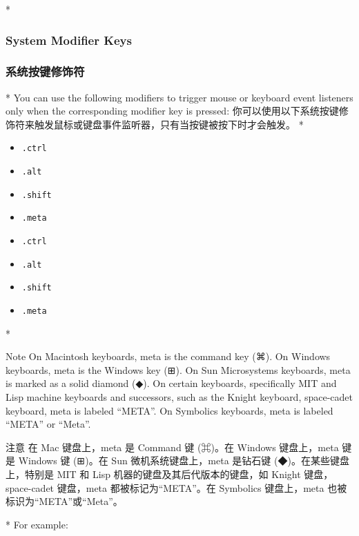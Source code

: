 \begin{paracol}{2}

\switchcolumn[0]*%
\subsubsection{System Modifier Keys}
\switchcolumn
\subsubsection{系统按键修饰符}
\switchcolumn[0]*%
You can use the following modifiers to trigger mouse or keyboard event
listeners only when the corresponding modifier key is pressed:
\switchcolumn
你可以使用以下系统按键修饰符来触发鼠标或键盘事件监听器，只有当按键被按下时才会触发。
\switchcolumn[0]*%
\begin{itemize}
\item
    \texttt{.ctrl}
\item
    \texttt{.alt}
\item
    \texttt{.shift}
\item
    \texttt{.meta}
\end{itemize}
\switchcolumn
\begin{itemize}
\item
    \texttt{.ctrl}
\item
    \texttt{.alt}
\item
    \texttt{.shift}
\item
    \texttt{.meta}
\end{itemize}
\switchcolumn[0]*%
\begin{vueQuote}{Note}
On Macintosh keyboards, meta is the command key (⌘). On Windows
keyboards, meta is the Windows key (⊞). On Sun Microsystems keyboards,
meta is marked as a solid diamond (◆). On certain keyboards,
specifically MIT and Lisp machine keyboards and successors, such as the
Knight keyboard, space-cadet keyboard, meta is labeled ``META''. On
Symbolics keyboards, meta is labeled ``META'' or ``Meta''.
\end{vueQuote}
\switchcolumn
\begin{vueQuote}{注意}
在 Mac 键盘上，meta 是 Command 键 (⌘)。在 Windows 键盘上，meta 键是
Windows 键 (⊞)。在 Sun 微机系统键盘上，meta 是钻石键
(◆)。在某些键盘上，特别是 MIT 和 Lisp 机器的键盘及其后代版本的键盘，如
Knight 键盘，space-cadet 键盘，meta 都被标记为``META''。在 Symbolics
键盘上，meta 也被标识为``META''或``Meta''。
\end{vueQuote}
\switchcolumn[0]*%
For example:
\switchcolumn

\end{paracol}
